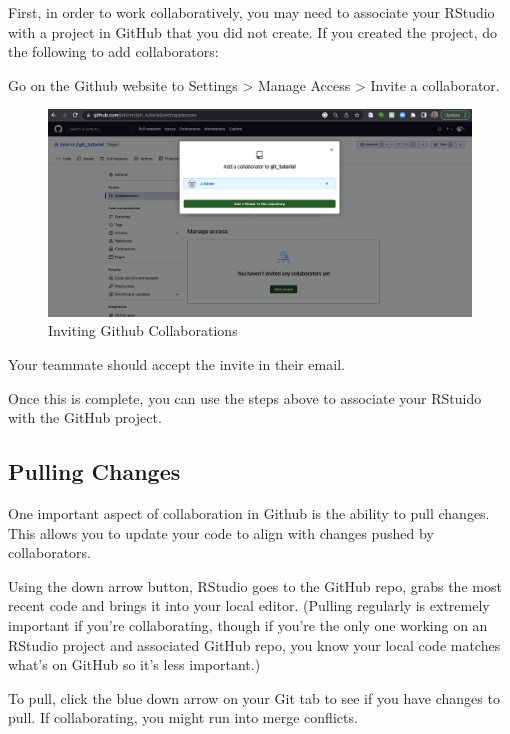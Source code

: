 \documentclass[
  letterpaper,
  DIV=11,
  numbers=noendperiod]{scrartcl}
\begin{document}
First, in order to work collaboratively, you may need to associate your
RStudio with a project in GitHub that you did not create. If you created
the project, do the following to add collaborators:

Go on the Github website to Settings \textgreater{} Manage Access
\textgreater{} Invite a collaborator.

\begin{figure}

{\centering \includegraphics{figures/16.PNG}

}

\caption{Inviting Github Collaborations}

\end{figure}

Your teammate should accept the invite in their email.

Once this is complete, you can use the steps above to associate your
RStuido with the GitHub project.

\hypertarget{pulling-changes}{%
\subsection{Pulling Changes}\label{pulling-changes}}

One important aspect of collaboration in Github is the ability to pull
changes. This allows you to update your code to align with changes
pushed by collaborators.

Using the down arrow button, RStudio goes to the GitHub repo, grabs the
most recent code and brings it into your local editor. (Pulling
regularly is extremely important if you're collaborating, though if
you're the only one working on an RStudio project and associated GitHub
repo, you know your local code matches what's on GitHub so it's less
important.)

To pull, click the blue down arrow on your Git tab to see if you have
changes to pull. If collaborating, you might run into merge conflicts.
\end{document}
